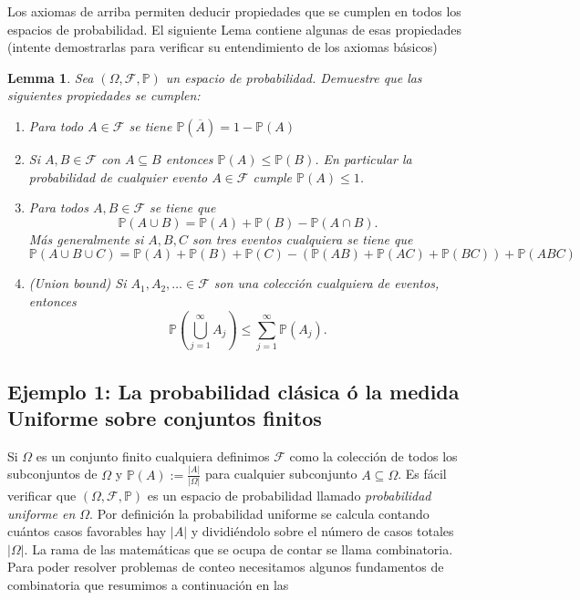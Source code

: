 \documentclass[12pt]{amsart}
\newtheorem{lemma}{Lemma}[section]
\theoremstyle{definition}
\renewcommand{\leq}{\leqslant}
\newcommand{\PP}{\ensuremath{\mathbb{P}}}
\newcommand{\calF}{\ensuremath{\mathcal{F}}}
\begin{document}
Los axiomas de arriba permiten deducir propiedades que se cumplen en todos los espacios de probabilidad. El siguiente Lema contiene algunas de esas propiedades (intente demostrarlas para verificar su entendimiento de los axiomas básicos)

\begin{lemma} Sea $(\Omega,\calF,\PP)$ un espacio de probabilidad. Demuestre que las siguientes propiedades se cumplen:

\begin{enumerate}
\item Para todo $A\in \calF$ se tiene $\PP(\overline{A})=1-\PP(A)$
\item Si $A,B\in \calF$ con $A\subseteq B$ entonces $\PP(A)\leq \PP(B)$. En particular la probabilidad de cualquier evento $A\in\calF$ cumple $\PP(A)\leq 1$.
\item Para todos $A,B\in \calF$ se tiene que 
\[\PP(A\cup B)=\PP(A)+\PP(B)-\PP(A\cap B).\]
Más generalmente si $A,B,C$ son tres eventos cualquiera se tiene que
\[\PP(A\cup B\cup C)=\PP(A)+\PP(B)+\PP(C)-\left(\PP(AB)+\PP(AC)+\PP(BC)\right)+\PP(ABC)\]
\item (\emph{Union bound}) Si $A_1,A_2,\dots\in\calF$ son una colección cualquiera de eventos, entonces \[\PP\left(\bigcup_{j=1}^\infty A_j\right)\leq \sum_{j=1}^\infty \PP(A_j).\]
\end{enumerate}
\end{lemma}


\subsection{Ejemplo 1: La probabilidad clásica ó la medida Uniforme sobre conjuntos finitos}

Si $\Omega$ es un conjunto finito cualquiera definimos $\calF$ como la colección de todos los subconjuntos de $\Omega$ y $\PP(A):=\frac{|A|}{|\Omega|}$ para cualquier subconjunto $A\subseteq \Omega$. Es fácil verificar que $(\Omega,\calF,\PP)$ es un espacio de probabilidad llamado \emph{probabilidad uniforme en $\Omega$}.
Por definición la probabilidad uniforme se calcula contando cuántos casos favorables hay $|A|$ y dividiéndolo sobre el número de casos totales $|\Omega|$. La rama de las matemáticas que se ocupa de contar se llama combinatoria. Para poder resolver problemas de conteo necesitamos algunos fundamentos de combinatoria que resumimos a continuación en las
\end{document}
